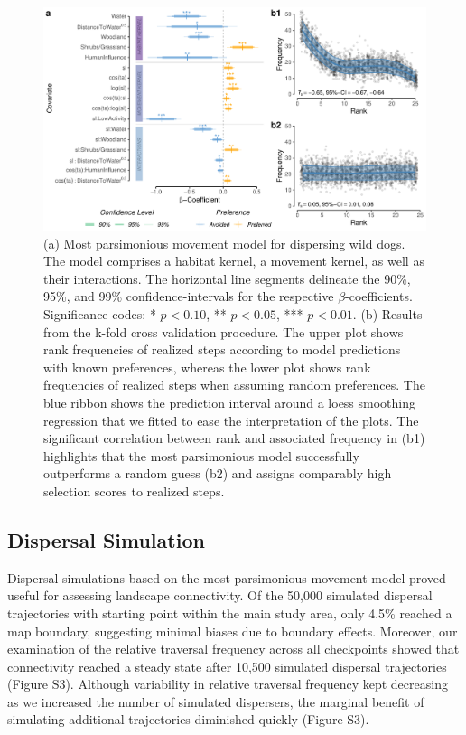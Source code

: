 \documentclass[abstract=on,10pt,a4paper,bibliography=totocnumbered]{article}
\begin{document}
\begin{figure}
  \begin{center}
    \includegraphics[width=\textwidth]{99_MovementModel}
    \caption{(a) Most parsimonious movement model for dispersing wild dogs. The
    model comprises a habitat kernel, a movement kernel, as well as their
    interactions. The horizontal line segments delineate the 90\%, 95\%, and
    99\% confidence-intervals for the respective \(\beta\)-coefficients.
    Significance codes: * \(p < 0.10\), ** \(p < 0.05\), *** \(p < 0.01\). (b)
    Results from the k-fold cross validation procedure. The upper plot shows
    rank frequencies of realized steps according to model predictions with known
    preferences, whereas the lower plot shows rank frequencies of realized steps
    when assuming random preferences. The blue ribbon shows the prediction
    interval around a loess smoothing regression that we fitted to ease the
    interpretation of the plots. The significant correlation between rank and
    associated frequency in (b1) highlights that the most parsimonious model
    successfully outperforms a random guess (b2) and assigns comparably high
    selection scores to realized steps.}
    \label{MovementModel}
  \end{center}
\end{figure}

\subsection{Dispersal Simulation}
Dispersal simulations based on the most parsimonious movement model proved
useful for assessing landscape connectivity. Of the 50,000 simulated dispersal
trajectories with starting point within the main study area, only 4.5\% reached
a map boundary, suggesting minimal biases due to boundary effects. Moreover, our
examination of the relative traversal frequency across all checkpoints showed
that connectivity reached a steady state after 10,500 simulated dispersal
trajectories (Figure S3). Although variability in relative traversal frequency
kept decreasing as we increased the number of simulated dispersers, the marginal
benefit of simulating additional trajectories diminished quickly (Figure S3).
\end{document}
